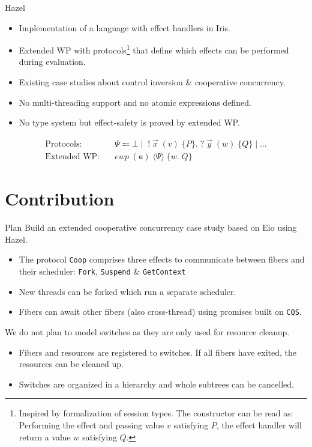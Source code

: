 \documentclass[aspectratio=43]{beamer}
\newcommand{\ocaml}[1]{\texttt{#1}}
\newcommand{\proto}{\texttt{Coop}}
\newcommand{\ewp}[3]{\textit{ewp}\; (#1)\; \langle #2 \rangle\; \{#3\}}
\begin{document}
\begin{frame}{Hazel}
    \begin{itemize}
        \item Implementation of a language with effect handlers in Iris.
        \item Extended WP with protocols\footnote{Inspired by formalization of session types. The constructor can be read as: Performing the effect and passing value \(v\) satisfying \(P\), the effect handler will return a value \(w\) satisfying \(Q\).} that define which effects can be performed during evaluation.
        \item Existing case studies about control inversion \& cooperative concurrency.
        \item No multi-threading support and no atomic expressions defined.
        \item No type system but effect-safety is proved by extended WP.
    \end{itemize}
    \begin{align*}
        \text{Protocols:}   & \quad \Psi \Coloneqq \bot \mid\; !\; \vec{x}\; (v)\; \{ P \}.\; ?\; \vec{y}\; (w)\; \{ Q \} \mid ... \\
        \text{Extended WP:} & \quad \ewp{\texttt{e}}{\Psi}{w.\; Q}
    \end{align*}
\end{frame}

\section{Contribution}

\begin{frame}{Plan}
    Build an extended cooperative concurrency case study based on Eio using Hazel.
    \begin{itemize}
        \item The protocol \proto{} comprises three effects to communicate between fibers and their scheduler: \ocaml{Fork}, \ocaml{Suspend} \& \ocaml{GetContext}
        \item New threads can be forked which run a separate scheduler.
        \item Fibers can await other fibers (also cross-thread) using promises built on \ocaml{CQS}.
    \end{itemize}
    We do not plan to model switches as they are only used for resource cleanup.
    \begin{itemize}
        \item Fibers and resources are registered to switches. If all fibers have exited, the resources can be cleaned up.
        \item Switches are organized in a hierarchy and whole subtrees can be cancelled.
    \end{itemize}
\end{frame}
\end{document}
